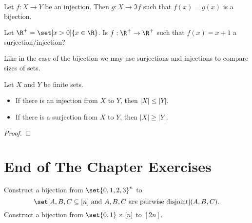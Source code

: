 \begin{remark}
  Let $f : X \to Y$ be an injection. Then $g : X \to \Im f$ such that
  $f(x) = g(x)$ is a bijection.
\end{remark}

\begin{exercise}
  Let $\R^+ = \set[x > 0]{x \in \R}$. Is $f : \R^+ \to \R^+$ such that
  $f(x) = x + 1$ a surjection/injection?
\end{exercise}

Like in the case of the bijection we may use surjections and injections to
compare sizes of sets.
\begin{theorem}
  Let $X$ and $Y$ be finite sets.
  \begin{itemize}
    \item If there is an injection from $X$ to $Y$, then $|X| \le |Y|$.
    \item If there is a surjection from $X$ to $Y$, then $|X| \ge |Y|$.
  \end{itemize}
\end{theorem}
\begin{proof}
\end{proof}

\section*{End of The Chapter Exercises}
\begin{exercises}
  \exerciseitem Construct a bijection from $\set{0, 1, 2, 3}^n$ to
    $$\set[{A, B, C \subseteq [n] \text{ and } A, B, C \text{ are pairwise
    disjoint}}]{(A, B, C)}.$$
  \exerciseitem Construct a bijection from $\set{0, 1} \times [n]$ to $[2n]$.
\end{exercises}
